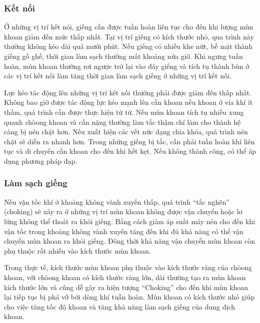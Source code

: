 \documentclass[13pt,a4paper]{article}
\begin{document}
\subsubsection{Kết nối}
	Ở những vị trí kết nói, giếng cần được tuần hoàn liên tục cho đến khi lượng mùn khoan giảm đến mức thấp nhất. Tại vị trí giếng có kích thước nhỏ, qua trình này thường không kéo dài quá mười phút. Nếu giếng có nhiều khe nứt, bề mặt thành giếng gồ ghề, thời gian làm sạch thường mất khoảng nửa giờ. Khi ngưng tuần hoàn, mùn khoan thường rơi ngược trở lại vào đáy giếng và tích tụ thành bùn ở các vị trí kết nối làm tăng thời gian làm sạch giếng ở những vị trí kết nối.\par
	Lực kéo tác động lên những vị trí kết nối thường phải được giảm đến thấp nhất. Không bao giờ được tác động lực kéo mạnh lên cần khoan nếu khoan ở vỉa khí ít thấm, quá trình cần được thực hiện từ từ. Nếu mùn khoan tích tụ nhiều xung quanh chòong khoan và cần nặng thường làm tắc thậm chí làm cho thành hệ càng bị nén chặt hơn. Nếu xuất hiện các vết nức dạng chìa khóa, quá trình nén chặt sẽ diễn ra nhanh hơn. Trong những giếng bị tắc, cần phải tuần hoàn khí liên tục và di chuyển cần khoan cho đến khi hết kẹt. Nếu không thành công, có thể áp dụng phương pháp đạp. 
\subsubsection{Làm sạch giếng}
	Nếu vận tốc khí ở khoảng không vành xuyến thấp, quá trình ``tắc nghẽn'' (choking) sẽ xảy ra ở những vị trí mùn khoan không được vận chuyển hoặc lơ lửng không thể thoát ra khỏi giếng. Bằng cách giảm áp suất máy nén cho đến khi vận tốc trong khoảng không vành xuyến tăng đến khi đủ khả năng có thể vận chuyển mùn khoan ra khỏi giếng. Đông thời khả năng vận chuyển mùn khoan còn phụ thuộc rất nhiều vào kích thước mùn khoan.\par
	Trong thực tế, kích thước mùn khoan phụ thuộc vào kích thước răng của chòong khoan, với chòong khoan có kích thước răng lớn, dài thường tạo ra mùn khoan kích thước lớn và cũng dễ gây ra hiện tượng ``Choking'' cho đến khi mùn khoan lại tiếp tục bị phá vỡ bởi dòng khí tuần hoàn. Mùn khoan có kích thước nhỏ giúp cho việc tăng tốc độ khoan và tăng khả năng làm sạch giếng của dung dịch khoan.
\end{document}
